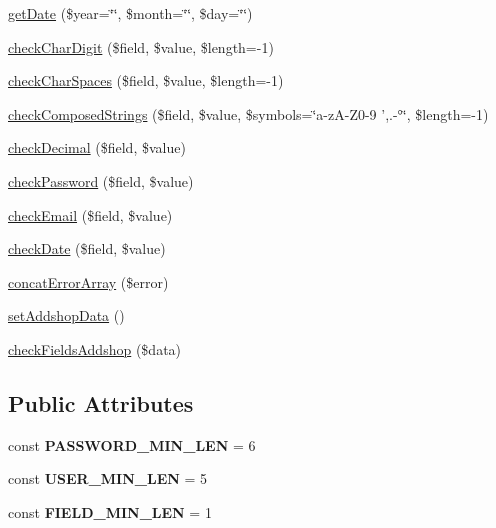 \begin{DoxyCompactItemize}
\item 
\hyperlink{classBasePageController_a2aaad6f0fa836c9d7e6d9df5974cb4a7}{get\+Date} (\$year=\char`\"{}\char`\"{}, \$month=\char`\"{}\char`\"{}, \$day=\char`\"{}\char`\"{})
\item 
\hyperlink{classBasePageController_ade6dad738c6fce22cf8b44028628090d}{check\+Char\+Digit} (\$field, \$value, \$length=-\/1)
\item 
\hyperlink{classBasePageController_ab4d71880bb1227a04df998de6cfc0f34}{check\+Char\+Spaces} (\$field, \$value, \$length=-\/1)
\item 
\hyperlink{classBasePageController_aaf4afedf5bb714c46c29e007eb095e55}{check\+Composed\+Strings} (\$field, \$value, \$symbols=\char`\"{}a-\/z\+A-\/Z0-\/9 ',.-\/°\char`\"{}, \$length=-\/1)
\item 
\hyperlink{classBasePageController_ad79d970cb91298dfa2206bfe22516618}{check\+Decimal} (\$field, \$value)
\item 
\hyperlink{classBasePageController_a6829b94ed721619b43879475c75b8fc8}{check\+Password} (\$field, \$value)
\item 
\hyperlink{classBasePageController_a5a0788181caf223a4ce208702c93e0c8}{check\+Email} (\$field, \$value)
\item 
\hyperlink{classBasePageController_a6f1a0a900ee8f95b6b6f12c52272a9a7}{check\+Date} (\$field, \$value)
\item 
\hyperlink{classBasePageController_ac0083ad81bbac88f3ca4bdf258566a07}{concat\+Error\+Array} (\$error)
\item 
\hyperlink{classBasePageController_a153a1dcf2e23be9499f8083828671c26}{set\+Addshop\+Data} ()
\item 
\hyperlink{classBasePageController_aa71c4d8a5aa7b90d2074e511fe4ddcc2}{check\+Fields\+Addshop} (\$data)
\end{DoxyCompactItemize}
\subsection*{Public Attributes}
\begin{DoxyCompactItemize}
\item 
\hypertarget{classBasePageController_a35247fc10b6367518b2232ea4d5ca90a}{const {\bfseries P\+A\+S\+S\+W\+O\+R\+D\+\_\+\+M\+I\+N\+\_\+\+L\+E\+N} = 6}\label{classBasePageController_a35247fc10b6367518b2232ea4d5ca90a}

\item 
\hypertarget{classBasePageController_acc0b220a790dddcd88a8ff7fd8fb88c9}{const {\bfseries U\+S\+E\+R\+\_\+\+M\+I\+N\+\_\+\+L\+E\+N} = 5}\label{classBasePageController_acc0b220a790dddcd88a8ff7fd8fb88c9}

\item 
\hypertarget{classBasePageController_a038012b54b56da5c27dbfc773ce75b00}{const {\bfseries F\+I\+E\+L\+D\+\_\+\+M\+I\+N\+\_\+\+L\+E\+N} = 1}\label{classBasePageController_a038012b54b56da5c27dbfc773ce75b00}

\end{DoxyCompactItemize}

